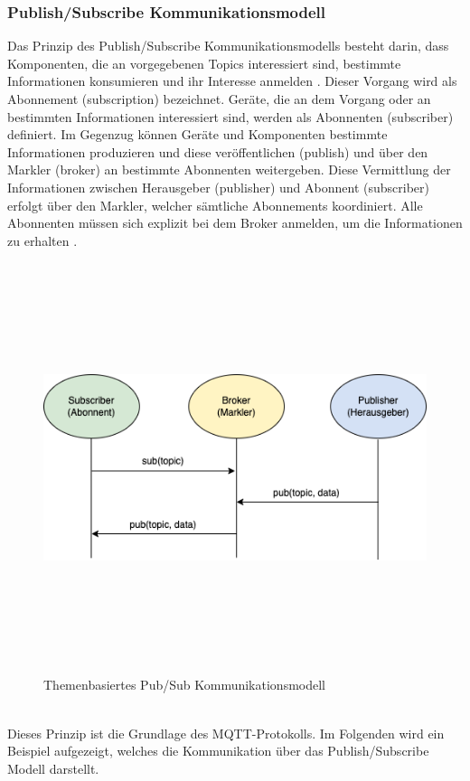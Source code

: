         \subsubsection*{Publish/Subscribe Kommunikationsmodell}
        \label{subsubsec:pubsub}
            Das Prinzip des Publish/Subscribe Kommunikationsmodells besteht darin, dass Komponenten, die an vorgegebenen Topics 
            interessiert sind, bestimmte Informationen konsumieren und ihr Interesse anmelden \cite{Hunkeler2008}. Dieser Vorgang wird als 
            Abonnement (subscription) bezeichnet. Geräte, die an dem Vorgang oder an bestimmten Informationen interessiert sind, 
            werden als Abonnenten (subscriber) definiert. Im Gegenzug können Geräte und Komponenten bestimmte Informationen produzieren und 
            diese veröffentlichen (publish) und über den Markler (broker) an bestimmte Abonnenten weitergeben. Diese Vermittlung der Informationen zwischen 
            Herausgeber (publisher) und Abonnent (subscriber) erfolgt über den Markler, welcher sämtliche Abonnements koordiniert. 
            Alle Abonnenten müssen sich explizit bei dem Broker anmelden, um die Informationen zu erhalten \cite{Hunkeler2008}. 
            \\
            \linebreak
            \pagebreak
            \begin{figure}[hbt!]
                \centering
                \includegraphics[width=12cm,height=12cm,keepaspectratio]{images/sub-model.drawio.png}
                \caption{Themenbasiertes Pub/Sub Kommunikationsmodell \cite{Hunkeler2008}}
                \label{pic:pub-sub-model}
            \end{figure}
            \\
            Dieses Prinzip ist die Grundlage des \acs{MQTT}-Protokolls. Im Folgenden wird ein Beispiel aufgezeigt, welches 
            die Kommunikation über das Publish/Subscribe Modell darstellt.
            
